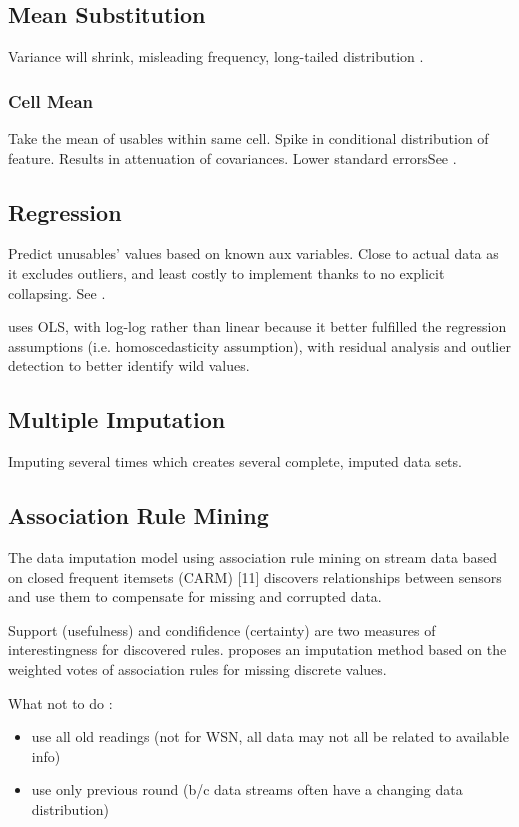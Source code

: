 \documentclass{article}
\begin{document}
\subsection{Mean Substitution}
Variance will shrink, misleading frequency, long-tailed distribution \cite{myrt}.
\subsubsection{Cell Mean}
Take the mean of usables within same cell. Spike in conditional distribution of feature. Results in attenuation of covariances. Lower standard errorsSee \cite{poni}.


\subsection{Regression}
Predict unusables' values based on known aux variables. Close to actual data as it excludes outliers, and least costly to implement thanks to no explicit collapsing. See \cite{poni}.

\cite{myrt} uses OLS, with log-log rather than linear because it better fulfilled the regression assumptions (i.e. homoscedasticity assumption), with residual analysis and outlier detection to better identify wild values. 


\subsection{Multiple Imputation}
Imputing several times which creates several complete, imputed data sets. \cite{myrt}


\subsection{Association Rule Mining}
The data imputation model using association rule mining on stream data based on
closed frequent itemsets (CARM) [11] discovers relationships between sensors and
use them to compensate for missing and corrupted data.\cite{jiang07}

Support (usefulness) and condifidence (certainty) are two measures of interestingness for discovered rules. 
\cite{wu} proposes an imputation method based on the weighted votes of association rules for missing discrete values.


What not to do \cite{jiang07}:
\begin{itemize}
	\item use all old readings (not for WSN, all data may not all be related to available info)
	\item use only previous round (b/c data streams often have a changing data distribution)
\end{itemize}
\end{document}
